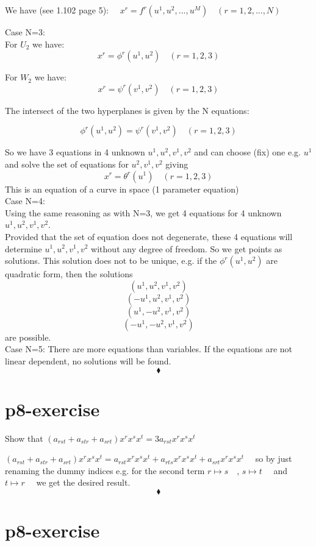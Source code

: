 We have (see 1.102 page 5):
$\quad x^r = f^r(u^1, u^2,..., u^M) \quad (r = 1, 2, ...,N)$

Case N=3: \\

For $U_2$ we have:
$$x^r = \phi^r(u^1, u^2) \quad (r = 1, 2, 3)$$

For $W_2$ we have:
$$x^r = \psi^r(v^1, v^2) \quad (r = 1, 2, 3)$$

The intersect of the two hyperplanes is given by the N equations:

$$\phi^r(u^1, u^2) = \psi^r(v^1, v^2) \quad (r = 1, 2, 3)$$

So we have 3 equations in 4 unknown $u^1,u^2, v^1, v^2$ and can choose (fix) one e.g. $u^1$ and solve the set of equations  for $u^2, v^1, v^2$ giving 
$$x^r = \theta^r(u^1) \quad (r = 1, 2, 3)$$
This is an equation of a curve in space (1 parameter equation)\\
Case N=4: \\
Using the same reasoning as with N=3, we get 4 equations for 4 unknown $u^1,u^2, v^1, v^2$.\\
Provided that the set of equation does not degenerate, these 4 equations will determine $u^1,u^2, v^1, v^2$ without any degree of freedom. So we get  points as solutions. This solution does not to be unique, e.g. if the $\phi^r(u^1, u^2)$ are quadratic form, then the solutions 
$$(u^1,u^2, v^1, v^2)$$
$$(-u^1,u^2, v^1, v^2)$$
$$ (u^1,-u^2, v^1, v^2)$$
$$ (-u^1,-u^2, v^1, v^2)$$
are possible.\\
Case N=5: 
There are more equations than variables. If the equations are not linear dependent, no solutions will be found.
$$\blacklozenge$$
\pagebreak[4]
\section{p8-exercise}

\begin{tcolorbox}
Show that $(a_{rst}+a_{str}+a_{srt})x^rx^sx^t = 3a_{rst}x^rx^sx^t$
\end{tcolorbox}
$(a_{rst}+a_{str}+a_{srt})x^rx^sx^t = a_{rst}x^rx^sx^t+a_{rts}x^rx^sx^t+a_{srt}x^rx^sx^t\quad$
so by just renaming the dummy indices e.g. for the second term  $r \mapsto s\quad$, $s \mapsto t\quad$ and $t \mapsto r\quad$ we get the desired result.
$$\blacklozenge$$
\pagebreak[4]

\section{p8-exercise}

